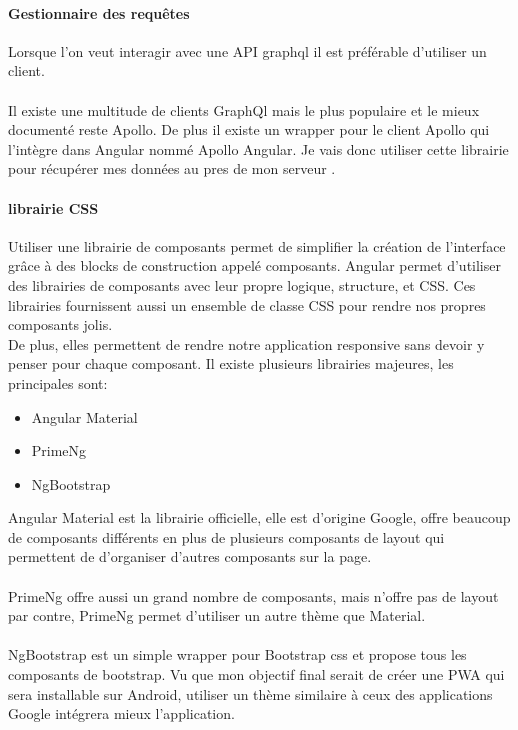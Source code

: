 \paragraph{Gestionnaire des requêtes}
Lorsque l'on veut interagir avec une API graphql il est préférable d'utiliser un client.\\\\

Il existe une multitude de clients GraphQl mais le plus populaire et le mieux documenté reste Apollo.
De plus il existe un wrapper pour le client Apollo qui l'intègre dans Angular nommé Apollo Angular.
Je vais donc utiliser cette librairie pour récupérer mes données au pres de mon serveur .

\paragraph{librairie CSS}
Utiliser une librairie de composants permet de simplifier la création de l'interface grâce à des blocks de construction appelé composants\@.
Angular permet d'utiliser des librairies de composants avec leur propre logique, structure, et CSS\@.
Ces librairies fournissent aussi un ensemble de classe CSS pour rendre nos propres composants jolis.\\
De plus, elles permettent de rendre notre application responsive sans devoir y penser pour chaque composant.
Il existe plusieurs librairies majeures, les principales sont:
\begin{itemize}
    \item Angular Material
    \item PrimeNg
    \item NgBootstrap
\end{itemize}
Angular Material est la librairie officielle, elle est d'origine Google,
offre beaucoup de composants différents en plus de plusieurs composants de layout qui permettent de d'organiser d'autres composants sur la page.\\\\

PrimeNg offre aussi un grand nombre de composants, mais n'offre pas de layout par contre,
PrimeNg permet d'utiliser un autre thème que Material.\\\\
NgBootstrap est un simple wrapper pour Bootstrap css et propose tous les composants de bootstrap.
Vu que mon objectif final serait de créer une PWA qui sera installable sur Android,
utiliser un thème similaire à ceux des applications Google intégrera mieux l'application.

